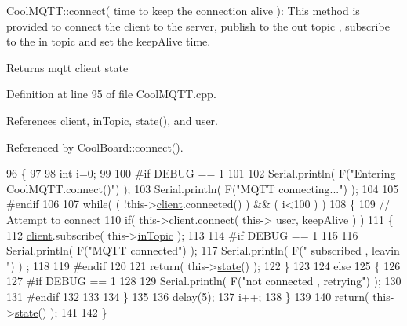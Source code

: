 Cool\+M\+Q\+T\+T\+::connect( time to keep the connection alive )\+: This method is provided to connect the client to the server, publish to the out topic , subscribe to the in topic and set the keep\+Alive time.

\begin{DoxyReturn}{Returns}
mqtt client state 
\end{DoxyReturn}


Definition at line 95 of file Cool\+M\+Q\+T\+T.\+cpp.



References client, in\+Topic, state(), and user.



Referenced by Cool\+Board\+::connect().


\begin{DoxyCode}
96 \{       
97 
98     \textcolor{keywordtype}{int} i=0;
99 
100 \textcolor{preprocessor}{#if DEBUG == 1 }
101 
102     Serial.println( F(\textcolor{stringliteral}{"Entering CoolMQTT.connect()"}) );
103     Serial.println( F(\textcolor{stringliteral}{"MQTT connecting..."}) );
104 
105 \textcolor{preprocessor}{#endif}
106 
107     \textcolor{keywordflow}{while}( ( !this->\hyperlink{classCoolMQTT_a4ca71e4f76ef868692a297efd45b1415}{client}.connected() ) && ( i<100 ) ) 
108     \{
109         \textcolor{comment}{// Attempt to connect}
110         \textcolor{keywordflow}{if}( this->\hyperlink{classCoolMQTT_a4ca71e4f76ef868692a297efd45b1415}{client}.connect( this-> \hyperlink{classCoolMQTT_a8cd47e45d457f908d4b4390b35aaee83}{user}, keepAlive ) )
111         \{
112             \hyperlink{classCoolMQTT_a4ca71e4f76ef868692a297efd45b1415}{client}.subscribe( this->\hyperlink{classCoolMQTT_a4492f52a441e83cc5151010317fdb52d}{inTopic} );
113 
114 \textcolor{preprocessor}{        #if DEBUG == 1 }
115 
116             Serial.println( F(\textcolor{stringliteral}{"MQTT connected"}) );
117             Serial.println( F(\textcolor{stringliteral}{" subscribed , leavin "}) ) ;
118         
119 \textcolor{preprocessor}{        #endif}
120 
121             \textcolor{keywordflow}{return}( this->\hyperlink{classCoolMQTT_a5d003307eff78efbd585e42b43b72b6d}{state}() );
122         \}
123 
124         \textcolor{keywordflow}{else}
125         \{
126         
127 \textcolor{preprocessor}{        #if DEBUG == 1 }
128 
129             Serial.println( F(\textcolor{stringliteral}{"not connected , retrying"}) );
130         
131 \textcolor{preprocessor}{        #endif}
132 
133             
134         \}
135 
136     delay(5);
137     i++;
138     \}
139     
140     \textcolor{keywordflow}{return}( this->\hyperlink{classCoolMQTT_a5d003307eff78efbd585e42b43b72b6d}{state}() );
141 
142 \}
\end{DoxyCode}
